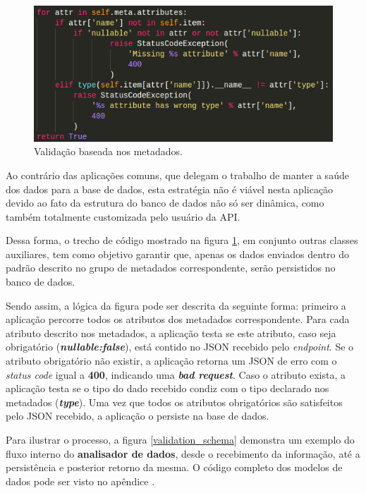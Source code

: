 \begin{figure}[h!tp]
	\caption{\label{validation}Validação baseada nos metadados.}
	\begin{center}
		\includegraphics[scale=0.83]{images/python_validation.png}
	\end{center}
	\hspace{5.5cm}{Fonte: O Autor.}
\end{figure}

Ao contrário das aplicações comuns, que delegam o trabalho de manter a saúde dos dados para a base de dados, esta estratégia não é viável nesta aplicação devido ao fato da estrutura do banco de dados não só ser dinâmica, como também totalmente customizada pelo usuário da API.

Dessa forma, o trecho de código mostrado na figura \ref{validation}, em conjunto outras classes auxiliares, tem como objetivo garantir que, apenas os dados enviados dentro do padrão descrito no grupo de metadados correspondente, serão persistidos no banco de dados.

Sendo assim, a lógica da figura pode ser descrita da seguinte forma: primeiro a aplicação percorre todos os atributos dos metadados correspondente. Para cada atributo descrito nos metadados, a aplicação testa se este atributo, caso seja obrigatório (\textbf{\textit{nullable:false}}), está contido no JSON recebido pelo \textit{endpoint}. Se o atributo obrigatório não existir, a aplicação retorna um JSON de erro com o \textit{status code} igual a \textbf{400}, indicando uma \textbf{\textit{bad request}}. Caso o atributo exista, a aplicação testa se o tipo do dado recebido condiz com o tipo declarado nos metadados (\textbf{\textit{type}}). Uma vez que todos os atributos obrigatórios são satisfeitos pelo JSON recebido, a aplicação o persiste na base de dados.

Para ilustrar o processo, a figura \ref{validation_schema} demonstra um exemplo do fluxo interno do \textbf{analisador de dados}, desde o recebimento da informação, até a persistência e posterior retorno da mesma. O código completo dos modelos de dados pode ser visto no apêndice .

